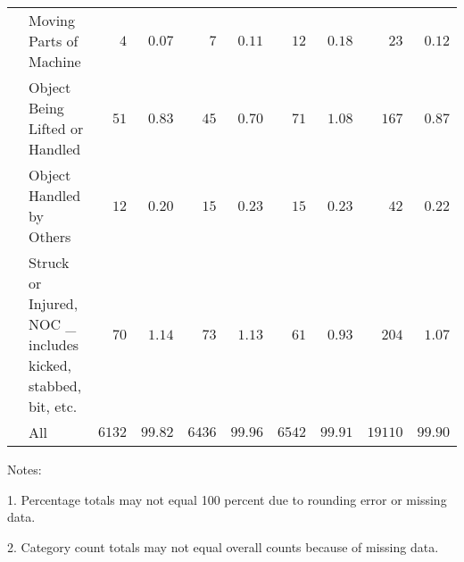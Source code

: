 \documentclass[9pt, oneside]{article}   	%
\begin{document}
\begin{longtable}{p{1.8in}p{2.2in}cccccccc}
 & Moving Parts of Machine  & $\phantom{000}4$ & $\phantom{0}0.07$ & $\phantom{000}7$ & $\phantom{0}0.11$ & $\phantom{00}12$ & $\phantom{0}0.18$ & $\phantom{000}23$ & $\phantom{0}0.12$ \\
 & Object Being Lifted or Handled  & $\phantom{00}51$ & $\phantom{0}0.83$ & $\phantom{00}45$ & $\phantom{0}0.70$ & $\phantom{00}71$ & $\phantom{0}1.08$ & $\phantom{00}167$ & $\phantom{0}0.87$ \\
 & Object Handled by Others  & $\phantom{00}12$ & $\phantom{0}0.20$ & $\phantom{00}15$ & $\phantom{0}0.23$ & $\phantom{00}15$ & $\phantom{0}0.23$ & $\phantom{000}42$ & $\phantom{0}0.22$ \\
 & Struck or Injured, NOC \_ includes kicked, stabbed, bit, etc.  & $\phantom{00}70$ & $\phantom{0}1.14$ & $\phantom{00}73$ & $\phantom{0}1.13$ & $\phantom{00}61$ & $\phantom{0}0.93$ & $\phantom{00}204$ & $\phantom{0}1.07$ \\
\cline{1-1} \cline{2-2} \cline{3-3} \cline{4-4} \cline{5-5} \cline{6-6} \cline{7-7} \cline{8-8} \cline{9-9} \cline{10-10} %
 & All  & $6132$ & $99.82$ & $6436$ & $99.96$ & $6542$ & $99.91$ & $19110$ & $99.90$ \\
\hline 
\end{longtable}

    \begin{tablenotes}
      \small
      Notes:
      \\
      \item 1. Percentage totals may not equal 100 percent due to rounding error or missing data.\\
      \item 2. Category count totals may not equal overall counts because of missing data.
      \end{tablenotes}
      

\pagebreak
\end{document}
